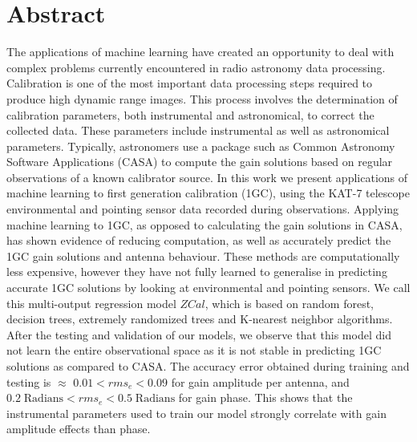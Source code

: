 \chapter*{Abstract} 


The applications of machine learning have created an opportunity to deal with complex problems currently encountered in radio astronomy data processing. Calibration is one of the most important data processing steps required to produce high dynamic range images. This process involves the determination of calibration parameters, both instrumental and astronomical, to correct the
collected data. These parameters include instrumental as well as astronomical parameters. Typically, astronomers use a package such as Common Astronomy Software Applications (CASA) to compute the gain solutions based on regular observations of a known calibrator source. In this work we present applications of machine learning to first generation calibration (1GC), using the KAT-7 telescope environmental and pointing sensor data recorded during observations. Applying machine learning to 1GC, as opposed to calculating the gain solutions in CASA, has shown evidence of reducing computation, as well as accurately predict the 1GC gain solutions and antenna behaviour. These methods are computationally less expensive, however they have not fully learned to generalise  in predicting  accurate 1GC solutions by looking at environmental and pointing sensors. We call this multi-output regression model $\textit{ZCal}$, which is based on random forest, decision trees, extremely randomized trees and K-nearest neighbor algorithms. After the testing and validation of our models, we observe that this model did not learn the entire observational space as it is not stable in predicting 1GC solutions as compared to CASA. The accuracy error obtained during training and testing is $\approx$ $0.01< rms_{e} <0.09$ for gain amplitude per antenna, and $0.2 \; \mathrm{Radians}< rms_{e}<0.5\; \mathrm{Radians}$ for gain phase. This shows that the instrumental parameters used to train our model strongly correlate with gain amplitude effects than phase.  



